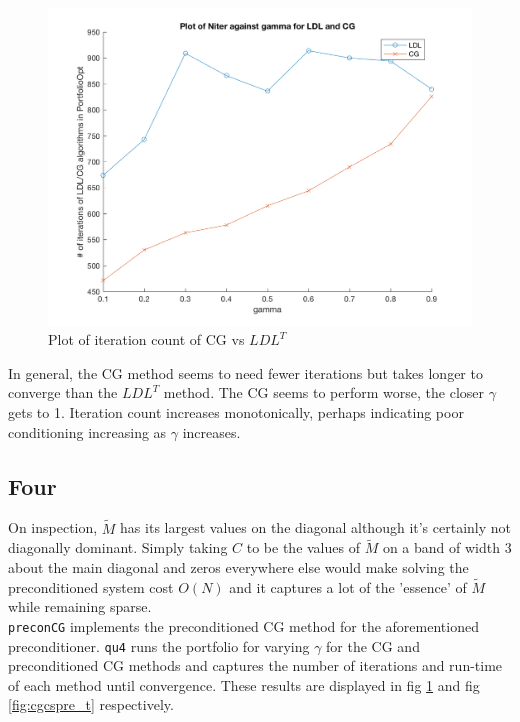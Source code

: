 \documentclass[paper=a4, fontsize=12pt]{scrartcl} %
\numberwithin{equation}{section}       %
\numberwithin{figure}{section}         %
\numberwithin{table}{section}          %
\begin{document}
\begin{center}
	\begin{figure}[h!]
	  \includegraphics[width=\linewidth]{CGvsLDL_Niter}
	  \caption{Plot of iteration count of CG vs $LDL^T$}
	  \label{fig:cgldlN}
	\end{figure}
\end{center}

In general, the CG method seems to need fewer iterations but takes longer to converge than the $LDL^T$ method. The CG seems to perform worse, the closer $\gamma$ gets to 1. Iteration count increases monotonically, perhaps indicating poor conditioning increasing as $\gamma$ increases.  \\

\subsection{Four}
On inspection, $\tilde{M}$ has its largest values on the diagonal although it's certainly not diagonally dominant. Simply taking $C$ to be the values of $\tilde{M}$ on a band of width 3 about the main diagonal and zeros everywhere else would make solving the preconditioned system cost $O(N)$  and it captures a lot of the 'essence' of $\tilde{M}$ while remaining sparse.\\ 
\indent \texttt{preconCG} implements the preconditioned CG method for the aforementioned preconditioner. \texttt{qu4} runs the portfolio for varying $\gamma$ for the CG and preconditioned CG methods and captures the number of iterations and run-time of each method until convergence. These results are displayed in fig \ref{fig:cgldlN} and fig \ref{fig:cgcspre_t} respectively. 
\end{document}
